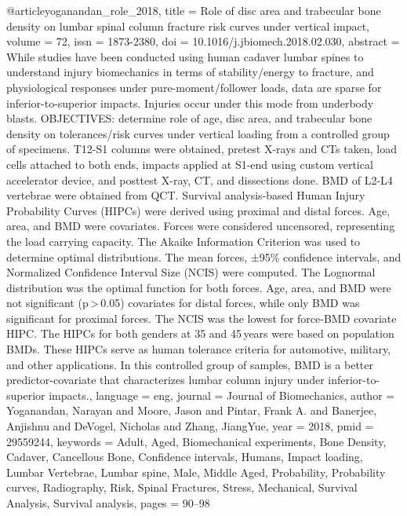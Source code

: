 @article{yoganandan_role_2018,
	title = {Role of disc area and trabecular bone density on lumbar spinal column fracture risk curves under vertical impact},
	volume = {72},
	issn = {1873-2380},
	doi = {10.1016/j.jbiomech.2018.02.030},
	abstract = {While studies have been conducted using human cadaver lumbar spines to understand injury biomechanics in terms of stability/energy to fracture, and physiological responses under pure-moment/follower loads, data are sparse for inferior-to-superior impacts. Injuries occur under this mode from underbody blasts.
OBJECTIVES: determine role of age, disc area, and trabecular bone density on tolerances/risk curves under vertical loading from a controlled group of specimens. T12-S1 columns were obtained, pretest X-rays and CTs taken, load cells attached to both ends, impacts applied at S1-end using custom vertical accelerator device, and posttest X-ray, CT, and dissections done. BMD of L2-L4 vertebrae were obtained from QCT. Survival analysis-based Human Injury Probability Curves (HIPCs) were derived using proximal and distal forces. Age, area, and BMD were covariates. Forces were considered uncensored, representing the load carrying capacity. The Akaike Information Criterion was used to determine optimal distributions. The mean forces, ±95\% confidence intervals, and Normalized Confidence Interval Size (NCIS) were computed. The Lognormal distribution was the optimal function for both forces. Age, area, and BMD were not significant (p {\textgreater} 0.05) covariates for distal forces, while only BMD was significant for proximal forces. The NCIS was the lowest for force-BMD covariate HIPC. The HIPCs for both genders at 35 and 45 years were based on population BMDs. These HIPCs serve as human tolerance criteria for automotive, military, and other applications. In this controlled group of samples, BMD is a better predictor-covariate that characterizes lumbar column injury under inferior-to-superior impacts.},
	language = {eng},
	journal = {Journal of Biomechanics},
	author = {Yoganandan, Narayan and Moore, Jason and Pintar, Frank A. and Banerjee, Anjishnu and DeVogel, Nicholas and Zhang, JiangYue},
	year = {2018},
	pmid = {29559244},
	keywords = {Adult, Aged, Biomechanical experiments, Bone Density, Cadaver, Cancellous Bone, Confidence intervals, Humans, Impact loading, Lumbar Vertebrae, Lumbar spine, Male, Middle Aged, Probability, Probability curves, Radiography, Risk, Spinal Fractures, Stress, Mechanical, Survival Analysis, Survival analysis},
	pages = {90--98}
}


